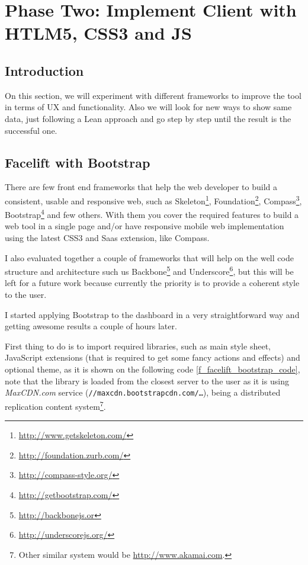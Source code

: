 \part{Phase Two: Implement Client with HTLM5, CSS3 and JS}

\chapter*{Introduction}
\label{c_phasetwo}
On this section, we will experiment with different frameworks to improve the
tool in terms of UX and functionality. Also we will look for new ways to show
same data, just following a Lean approach and go step by step until the result
is the successful one.


\chapter{Facelift with Bootstrap}
There are few front end frameworks that help the web developer to build a
consistent, usable and responsive web, such as
Skeleton\footnote{\url{http://www.getskeleton.com/}},
Foundation\footnote{\url{http://foundation.zurb.com/}},
Compass\footnote{\url{http://compass-style.org/}},
Bootstrap\footnote{\url{http://getbootstrap.com/}} and few others. With them
you cover the required features to build a web tool in a
single page and/or have responsive mobile web implementation using the latest
CSS3 and Saas extension, like Compass.

I also evaluated together a couple of frameworks that will help on the well code
structure and architecture such us Backbone\footnote{\url{http://backbonejs.or}}
and Underscore\footnote{\url{http://underscorejs.org/}}, but this will be left
for a future work because currently the priority is to provide a coherent style
to the user.

I started applying Bootstrap to the dashboard in a very straightforward way and
getting awesome results a couple of hours later.

First thing to do is to import required libraries, such as main style sheet,
JavaScript extensions (that is required to get some fancy actions and effects)
and optional theme, as it is shown on the following code
\ref{f_facelift_bootstrap_code}, note that the library is loaded from the
closest server to the user as it is using \emph{MaxCDN.com} service
(\texttt{//maxcdn.bootstrapcdn.com/\ldots}), being a distributed replication
content system\footnote{Other similar system would be
\url{http://www.akamai.com}.}.

